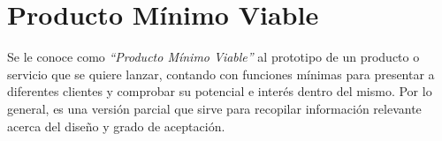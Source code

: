 \section*{Producto Mínimo Viable}
Se le conoce como \textit{``Producto Mínimo Viable''} al prototipo de un producto o servicio que se quiere lanzar, contando con funciones mínimas para presentar a diferentes clientes y comprobar su potencial e interés dentro del mismo. Por lo general, es una versión parcial que sirve para recopilar información relevante acerca del diseño y grado de aceptación.

%

